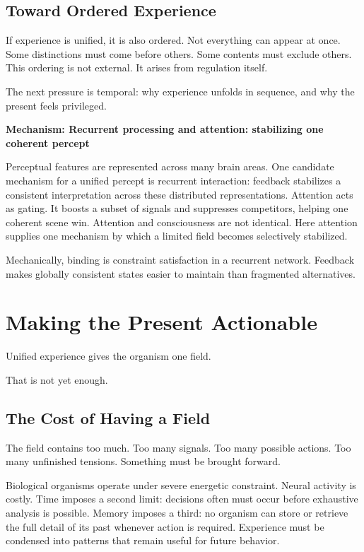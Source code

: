 \documentclass[11pt,twoside,openright]{book}
\newenvironment{mechanismbox}[1]
  {\begin{framed}\noindent\textbf{Mechanism: #1}\par\medskip}
  {\end{framed}}
\begin{document}
\section*{Toward Ordered Experience}

If experience is unified, it is also ordered. Not everything can appear at once. Some distinctions must come before others. Some contents must exclude others. This ordering is not external. It arises from regulation itself.

The next pressure is temporal: why experience unfolds in sequence, and why the present feels privileged.

\begin{mechanismbox}{Recurrent processing and attention: stabilizing one coherent percept}

Perceptual features are represented across many brain areas. One candidate mechanism for a unified percept is recurrent interaction: feedback stabilizes a consistent interpretation across these distributed representations. Attention acts as gating. It boosts a subset of signals and suppresses competitors, helping one coherent scene win. Attention and consciousness are not identical. Here attention supplies one mechanism by which a limited field becomes selectively stabilized.

Mechanically, binding is constraint satisfaction in a recurrent network. Feedback makes globally consistent states easier to maintain than fragmented alternatives.

\end{mechanismbox}

\chapter{Making the Present Actionable}

Unified experience gives the organism one field.

That is not yet enough.

\section*{The Cost of Having a Field}

The field contains too much. Too many signals. Too many possible actions. Too many unfinished tensions. Something must be brought forward.

Biological organisms operate under severe energetic constraint. Neural activity is costly. Time imposes a second limit: decisions often must occur before exhaustive analysis is possible. Memory imposes a third: no organism can store or retrieve the full detail of its past whenever action is required. Experience must be condensed into patterns that remain useful for future behavior.
\end{document}
